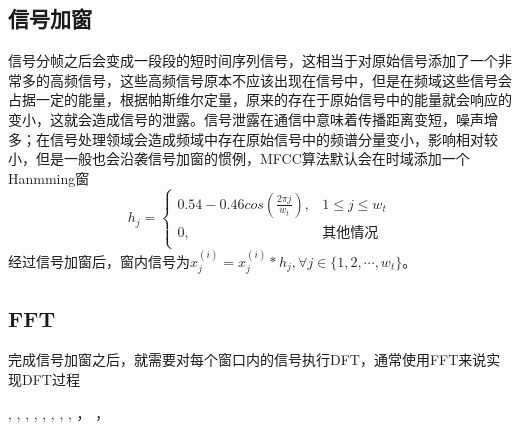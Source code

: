 \documentclass[twoside,a4paper,12pt]{book}%
\begin{document}
\subsection{信号加窗}
信号分帧之后会变成一段段的短时间序列信号，这相当于对原始信号添加了一个非常多的高频信号，这些高频信号原本不应该出现在信号中，但是在频域这些信号会占据一定的能量，根据帕斯维尔定量，原来的存在于原始信号中的能量就会响应的变小，这就会造成信号的泄露。信号泄露在通信中意味着传播距离变短，噪声增多；在信号处理领域会造成频域中存在原始信号中的频谱分量变小，影响相对较小，但是一般也会沿袭信号加窗的惯例，MFCC算法默认会在时域添加一个Hanmming窗
$$
h_j  =\left\{  
             \begin{array}{ll}  
             0.54-0.46cos(\frac{2 \pi j}{w_t}), & 1 \le j \le w_t \\  
             0, & \text{其他情况} \\   
             \end{array}  
\right .  
$$
经过信号加窗后，窗内信号为$x^{(i)}_j=x^{(i)}_j*h_j, \forall j \in \{1,2,\cdots,w_t\}$。
\subsection{FFT}
完成信号加窗之后，就需要对每个窗口内的信号执行DFT，通常使用FFT来说实现DFT过程


\cite{Moody2016Mixing,2019Hierarchically,2016Attention},
\cite{Liu2016Attention},
\cite{peters-etal-2018-deep},
\cite{2016Pairwise,inproceedings},
\cite{Talman2019Sentence,2001Greedy},
\cite{zhang2015character-level},
\cite{yang2016hierarchical}
\cite{joulin2017bag,lai2015recurrent,hochreiter1997long,Pennington2014Glove,2017Fixing,2018Slot,1997Long,wang2018glue,dauphin2016language,mikolov2010recurrent},
\cite{radford2019language,vaswani2017attention,strubell2017fast,huang2015bidirectional,devlin2018bert,chen2017enhanced,yin2016abcnn,humeau2019poly-encoders},
\cite{mikolov2013efficient,sutskever2014sequence,chen2016xgboost,suykens2001support,akhtar2019textrank,blei2003latent,bengio2003a,kim2014convolutional}
\cite{bahdanau2014neural,ID_lihang,ID_zhouzhihua,2018A,Baradaran2020A,2016Bidirectional}
\cite{2018QANet,2016ReasoNet,2016Machine,2017MEMEN,2015Teaching,2017RACE,2016Iterative,2016Dynamic}
\cite{Joachims2009Learning,papineni2002bleu,yang2019xlnet,dai2019transformerxl,m2019spanbert,gehring2017convolutional}
\cite{inproceedings,chang2008bigtable}
\cite{shi2010list-wise,shen2014a,Kiefel_underreview,chang2020pre-training}
\cite{li2018survey,joachims2002optimizing}
\cite{peters-etal-2018-deep}
\cite{2016Pairwise,2017A,2018Investigating,2017Deep1}
\cite{zhang2015character-level,2003A,2012A}
\cite{yang2016hierarchical,2020ERNIE}
\cite{Talman2019Sentence,chen2017enhanced,Krizhevsky2012ImageNet}，
\cite{kingma2014adam,Hinton2014A,Rumelhart1986Learning,2019RoBERTa}，
\cite{10.5555/3086952,dai2019transformer-xl,2017Focal,IDPatternrecognition,IDMTBook,IDCNLP,Lecun2015Deep}

  

\end{document}
